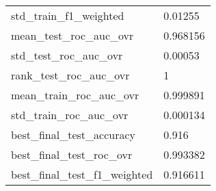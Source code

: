 \begin{tabular}{ll}
std\_train\_f1\_weighted         &                                            0.01255 \\
mean\_test\_roc\_auc\_ovr         &                                           0.968156 \\
std\_test\_roc\_auc\_ovr          &                                            0.00053 \\
rank\_test\_roc\_auc\_ovr         &                                                  1 \\
mean\_train\_roc\_auc\_ovr        &                                           0.999891 \\
std\_train\_roc\_auc\_ovr         &                                           0.000134 \\
best\_final\_test\_accuracy      &                                              0.916 \\
best\_final\_test\_roc\_ovr       &                                           0.993382 \\
best\_final\_test\_f1\_weighted   &                                           0.916611 \\
\bottomrule
\end{tabular}
